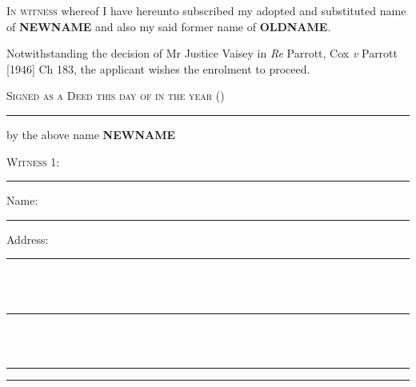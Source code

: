 \documentclass[10pt, twoside, a4paper]{article}
\begin{document}
{\scshape In witness} whereof I have hereunto subscribed my adopted and
substituted name of \textbf{NEWNAME} and also my said former name of
\textbf{OLDNAME}.

\vspace{12pt}

Notwithstanding the decision of Mr Justice Vaisey in \textit{Re} Parrott, Cox
\textit{v} Parrott [1946] Ch 183, the applicant wishes the enrolment to proceed.

\vspace{24pt}

{
	\scshape
	Signed as a Deed this \nth{\the\day} day of \monthname{} in the year
	{\the\year} (\isodate{\today})
}

\vspace{48pt}

\begin{multicols}{2}

	\par\noindent\hrule
	\vspace{14pt}

	{
		\centering
		\noindent
		by the above name \textbf{NEWNAME}
		\par
	}

	\vspace{60pt}

	{\scshape \noindent Witness 1:}

	\vspace{48pt}
	\par\noindent\hrule
	\vspace{14pt}

	{
		\scshape

		\noindent Name: \\
		\noindent\hspace*{4em}\rule{0.35\textwidth}{0.5pt}

		\vspace{12pt}

		\noindent Address:

		\noindent\hspace*{4em}\rule{0.35\textwidth}{0.5pt} \\ \\
		\noindent\hspace*{4em}\rule{0.35\textwidth}{0.5pt} \\ \\
		\noindent\hspace*{4em}\rule{0.35\textwidth}{0.5pt}
	}

	\columnbreak

	\par\noindent\hrule
	\vspace{14pt}


\end{multicols}
\end{document}
